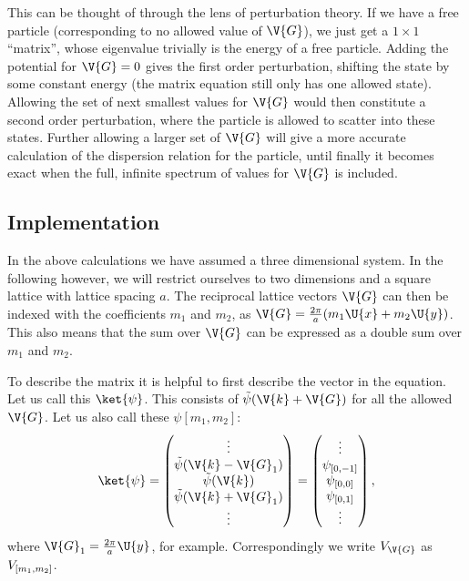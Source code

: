 \documentclass[main.tex]{subfiles}
\begin{document}
	This can be thought of through the lens of perturbation theory. If we have a free particle (corresponding to no allowed value of $ \V{G} $), we just get a $ 1\times 1$ ``matrix'', whose eigenvalue trivially is the energy of a free particle. Adding the potential for $ \V{G} = 0 $ gives the first order perturbation, shifting the state by some constant energy (the matrix equation still only has one allowed state). Allowing the set of next smallest values for $ \V{G} $ would then constitute a second order perturbation, where the particle is allowed to scatter into these states. Further allowing a larger set of $ \V{G} $ will give a more accurate calculation of the dispersion relation for the particle, until finally it becomes exact when the full, infinite spectrum of values for $ \V{G} $ is included.
	
	\subsection{Implementation}
	In the above calculations we have assumed a three dimensional system. In the following however, we will restrict ourselves to two dimensions and a square lattice with lattice spacing $ a $. The reciprocal lattice vectors $ \V{G} $ can then be indexed with the coefficients $ m_1 $ and $ m_2 $, as $ \V{G} = \frac{2\pi}{a} (m_1 \U{x} + m_2 \U{y}) $. This also means that the sum over $ \V{G} $ can be expressed as a double sum over $ m_1 $ and $ m_2 $. 
	
	To describe the matrix it is helpful to first describe the vector in the equation. Let us call this $ \ket{\psi} $. This consists of $ \tilde{\psi} (\V{k}+\V{G}) $ for all the allowed $ \V{G} $. Let us also call these $ \psi[m_1, m_2] $:
	\begin{equation}
		\ket{\psi} = \begin{pmatrix}
		\vdots \\ \tilde{\psi}(\V{k}-\V{G}_1) \\ \tilde{\psi}(\V{k}) \\ \tilde{\psi}(\V{k}+\V{G}_1) \\ \vdots
		\end{pmatrix} = \begin{pmatrix}
		\vdots \\ \psi\coef{0, -1}\\ \psi\coef{0, 0} \\ \psi\coef{0, 1} \\ \vdots
		\end{pmatrix},
	\end{equation}
	where $ \V{G}_1 = \frac{2\pi}{a} \U{y}$, for example. Correspondingly we write $ V_{\V{G}} $ as $ V_{[m_1, m_2]} $.
\end{document}
